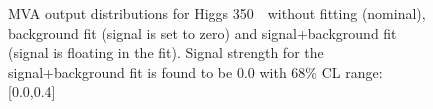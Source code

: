 \begin{figure}[!hbtp]
\caption{
MVA output distributions for Higgs 350~\GeV\ without fitting
(nominal), background fit (signal is set to zero) and
signal+background fit (signal is floating in the fit). Signal strength
for the signal+background fit is found to be 0.0 with 68\% CL range:
[0.0,0.4]  }
\label{fig:fit_350}
\end{figure}

